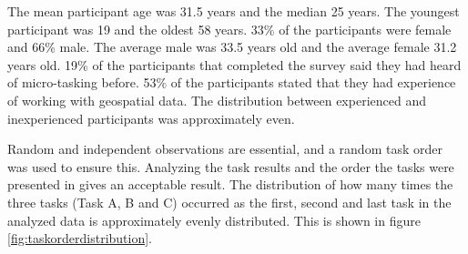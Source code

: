 The mean participant age was 31.5 years and the median 25 years. The youngest participant was 19 and the oldest 58 years. 33\% of the participants were female and 66\% male. The average male was 33.5 years old and the average female 31.2 years old. 19\% of the participants that completed the survey said they had heard of micro-tasking before. 53\% of the participants stated that they had experience of working with geospatial data. The distribution between experienced and inexperienced participants was approximately even. 

Random and independent observations are essential, and a random task order was used to ensure this. Analyzing the task results and the order the tasks were presented in gives an acceptable result. The distribution of how many times the three tasks (Task A, B and C) occurred as the first, second and last task in the analyzed data is approximately evenly distributed. This is shown in figure \ref{fig:taskorderdistribution}.

